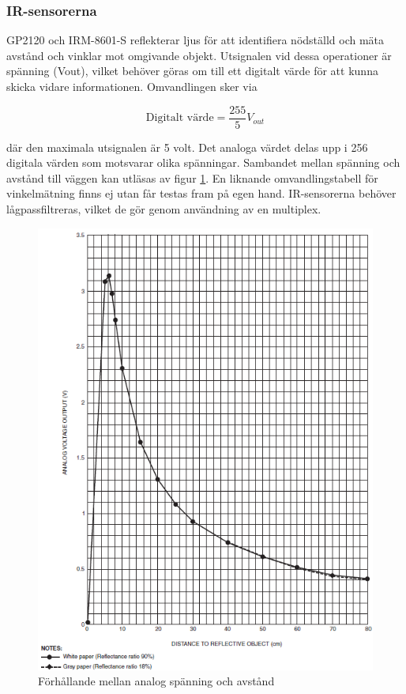 \documentclass[11pt]{article}
\begin{document}
\begin{flushleft}
\subsubsection{IR-sensorerna}
GP2120 och IRM-8601-S reflekterar ljus för att identifiera nödställd och mäta avstånd och vinklar mot omgivande objekt. Utsignalen vid dessa operationer är spänning (Vout), vilket behöver göras om till ett digitalt värde för att kunna skicka vidare informationen. Omvandlingen sker via 

\begin{equation*}
	\textrm{Digitalt värde} = \frac{255}{5}V_{out}
\end{equation*}

där den maximala utsignalen är 5 volt. Det analoga värdet delas upp i 256 digitala värden som motsvarar olika spänningar. Sambandet mellan spänning och avstånd till väggen kan utläsas av figur \ref{IR_avstand}. En liknande omvandlingstabell för vinkelmätning finns ej utan får testas fram på egen hand. IR-sensorerna behöver lågpassfiltreras, vilket de gör genom användning av en multiplex.

\begin{figure}[htbp]
	\centering
	\includegraphics[scale=0.4]{images/IR_avstand}
	\caption{Förhållande mellan analog spänning och avstånd \label{IR_avstand}}
\end{figure}


\end{flushleft}
\end{document}
